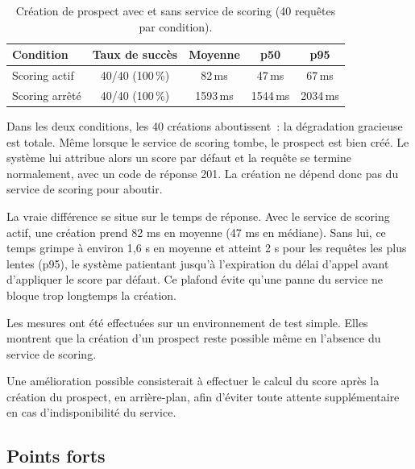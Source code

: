 \begin{table}[h]
    \centering
    \renewcommand{\arraystretch}{1.4}
    \setlength{\tabcolsep}{10pt}
    \begin{tabular}{|l|c|c|c|c|}
        \hline
        \textbf{Condition} & \textbf{Taux de succès} & \textbf{Moyenne} & \textbf{p50} & \textbf{p95} \\
        \hline
        Scoring actif   & 40/40 (100\,\%) & 82\,ms   & 47\,ms   & 67\,ms \\
        \hline
        Scoring arrêté  & 40/40 (100\,\%) & 1593\,ms & 1544\,ms & 2034\,ms \\
        \hline
    \end{tabular}
    \caption{Création de prospect avec et sans service de scoring
        (40 requêtes par condition).}
    \label{tab:eval_degradation}
\end{table}

Dans les deux conditions, les 40 créations aboutissent~: la dégradation gracieuse
est totale.
Même lorsque le service de scoring tombe, le prospect est bien créé. Le système lui attribue alors un score par défaut et la requête se termine normalement, avec un code de réponse 201. La création ne dépend donc pas du service de scoring pour aboutir.

La vraie différence se situe sur le temps de réponse. Avec le service de scoring actif, une création prend 82 ms en moyenne (47 ms en médiane). Sans lui, ce temps grimpe à environ 1,6 s en moyenne et atteint 2 s pour les requêtes les plus lentes (p95), le système patientant jusqu'à l'expiration du délai d'appel avant d'appliquer le score par défaut. Ce plafond évite qu'une panne du service ne bloque trop longtemps la création.

Les mesures ont été effectuées sur un environnement de test simple. Elles montrent que la création d'un prospect reste possible même en l'absence du service de scoring.

Une amélioration possible consisterait à effectuer le calcul du score après la création du prospect, en arrière-plan, afin d'éviter toute attente supplémentaire en cas d'indisponibilité du service.


\subsection{Points forts}

